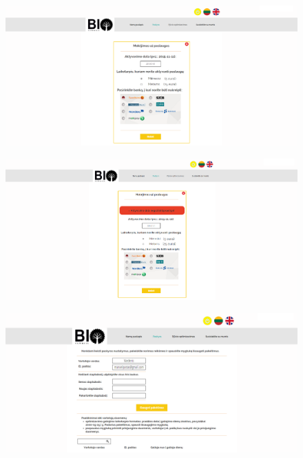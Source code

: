 \documentclass[a4paper,12pt]{article}
\begin{document}
\begin{figure}[!tph]
\hspace{-3cm}
\centering
\includegraphics[scale=0.5]{interfeisai/paskyrosPuslapisVartotojasMokejimas}
\label{fig:verticalcell}
\end{figure}

\begin{figure}[!tph]
\hspace{-3cm}
\centering
\includegraphics[scale=0.5]{interfeisai/paskyrosPuslapisVartotojasMokejimasSuKlaida}
\label{fig:verticalcell}
\end{figure}


\begin{figure}[!tph]
\hspace{-3cm}
\centering
\includegraphics[scale=0.5]{interfeisai/paskyrosPuslapisAdministratorius}
\label{fig:verticalcell}
\end{figure}
\end{document}
